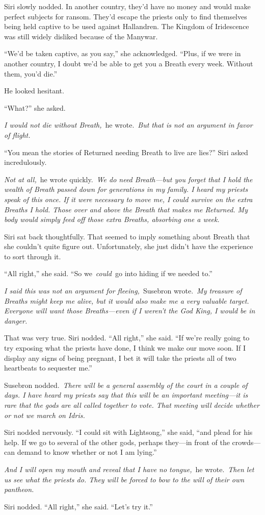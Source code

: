 Siri slowly nodded. In another country, they’d have no money and would make perfect subjects for ransom. They’d escape the priests only to find themselves being held captive to be used against Hallandren. The Kingdom of Iridescence was still widely disliked because of the Manywar.

“We’d be taken captive, as you say,” she acknowledged. “Plus, if we were in another country, I doubt we’d be able to get you a Breath every week. Without them, you’d die.”

He looked hesitant.

“What?” she asked.

\textit{I would not die without Breath,}~he wrote.~\textit{But that is not an argument in favor of flight.}

“You mean the stories of Returned needing Breath to live are lies?” Siri asked incredulously.

\textit{Not at all,}~he wrote quickly.~\textit{We do need Breath—but you forget that I hold the wealth of Breath passed down for generations in my family. I heard my priests speak of this once. If it were necessary to move me, I could survive on the extra Breaths I hold. Those over and above the Breath that makes me Returned. My body would simply feed off those extra Breaths, absorbing one a week.}

Siri sat back thoughtfully. That seemed to imply something about Breath that she couldn’t quite figure out. Unfortunately, she just didn’t have the experience to sort through it.

“All right,” she said. “So we~\textit{could}~go into hiding if we needed to.”

\textit{I said this was not an argument for fleeing,}~Susebron wrote.~\textit{My treasure of Breaths might keep me alive, but it would also make me a very valuable target. Everyone will want those Breaths—even if I weren’t the God King, I would be in danger.}

That was very true. Siri nodded. “All right,” she said. “If we’re really going to try exposing what the priests have done, I think we make our move soon. If I display any signs of being pregnant, I bet it will take the priests all of two heartbeats to sequester me.”

Susebron nodded.~\textit{There will be a general assembly of the court in a couple of days. I have heard my priests say that this will be an important meeting—it is rare that the gods are all called together to vote. That meeting will decide whether or not we march on Idris.}

Siri nodded nervously. “I could sit with Lightsong,” she said, “and plead for his help. If we go to several of the other gods, perhaps they—in front of the crowds—can demand to know whether or not I am lying.”

\textit{And I will open my mouth and reveal that I have no tongue,}~he wrote.~\textit{Then let us see what the priests do. They will be forced to bow to the will of their own pantheon.}

Siri nodded. “All right,” she said. “Let’s try it.”

